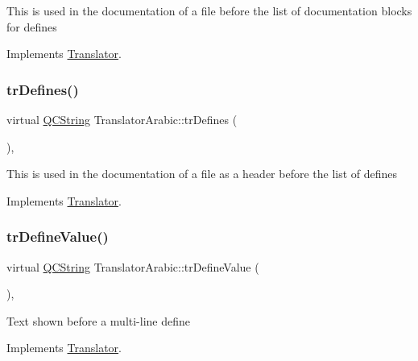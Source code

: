 This is used in the documentation of a file before the list of documentation blocks for defines 

Implements \mbox{\hyperlink{class_translator}{Translator}}.

\mbox{\label{class_translator_arabic_a94a8e0d1f335193616003f21b5a68c20}} 
\subsubsection{\texorpdfstring{trDefines()}{trDefines()}}
{\footnotesize\ttfamily virtual \mbox{\hyperlink{class_q_c_string}{Q\+C\+String}} Translator\+Arabic\+::tr\+Defines (\begin{DoxyParamCaption}{ }\end{DoxyParamCaption})\hspace{0.3cm}{\ttfamily [inline]}, {\ttfamily [virtual]}}

This is used in the documentation of a file as a header before the list of defines 

Implements \mbox{\hyperlink{class_translator}{Translator}}.

\mbox{\label{class_translator_arabic_a69d32547d8c7f9c08fdd5414adb2af57}} 
\subsubsection{\texorpdfstring{trDefineValue()}{trDefineValue()}}
{\footnotesize\ttfamily virtual \mbox{\hyperlink{class_q_c_string}{Q\+C\+String}} Translator\+Arabic\+::tr\+Define\+Value (\begin{DoxyParamCaption}{ }\end{DoxyParamCaption})\hspace{0.3cm}{\ttfamily [inline]}, {\ttfamily [virtual]}}

Text shown before a multi-\/line define 

Implements \mbox{\hyperlink{class_translator}{Translator}}.

\mbox{\label{class_translator_arabic_a6364c3efba8cdc7bd7518b779c605ec8}} 
